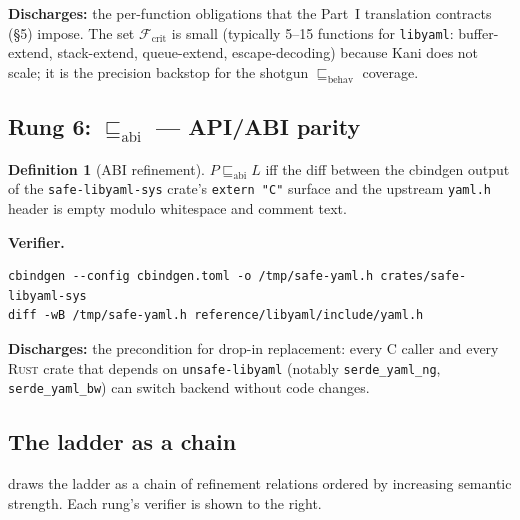 \documentclass[12pt]{article}
\theoremstyle{definition}
\newtheorem{definition}[theorem]{Definition}
\theoremstyle{remark}
\newcommand{\rust}{\textnormal{\textsc{Rust}}}
\newcommand{\libyaml}{\texttt{libyaml}}
\newcommand{\unsafelibyaml}{\texttt{unsafe-libyaml}}
\newcommand{\Behav}{\ensuremath{\sqsubseteq_{\!\mathrm{behav}}}}
\newcommand{\ABI}{\ensuremath{\sqsubseteq_{\!\mathrm{abi}}}}
\begin{document}
\textbf{Discharges:} the per-function obligations that the Part~I
translation contracts (\S{}5) impose. The set
\(\mathcal{F}_{\mathrm{crit}}\) is small (typically 5--15 functions for
\libyaml{}: buffer-extend, stack-extend, queue-extend,
escape-decoding) because Kani does not scale; it is the precision
backstop for the shotgun \(\Behav\) coverage.

\subsection{Rung 6: $\ABI$ --- API/ABI parity}

\begin{definition}[ABI refinement]
\label{def:abi}
\(P \ABI L\) iff the diff between the cbindgen output of the
\texttt{safe-libyaml-sys} crate's \texttt{extern "C"} surface and the
upstream \texttt{yaml.h} header is empty modulo whitespace and comment
text.
\end{definition}

\textbf{Verifier.}
\begin{lstlisting}[style=bashstyle]
cbindgen --config cbindgen.toml -o /tmp/safe-yaml.h crates/safe-libyaml-sys
diff -wB /tmp/safe-yaml.h reference/libyaml/include/yaml.h
\end{lstlisting}

\textbf{Discharges:} the precondition for drop-in replacement: every C
caller and every \rust{} crate that depends on \unsafelibyaml{}
(notably \texttt{serde\_yaml\_ng}, \texttt{serde\_yaml\_bw}) can switch
backend without code changes.

\subsection{The ladder as a chain}

 draws the ladder as a chain of refinement relations
ordered by increasing semantic strength. Each rung's verifier is shown
to the right.
\end{document}
